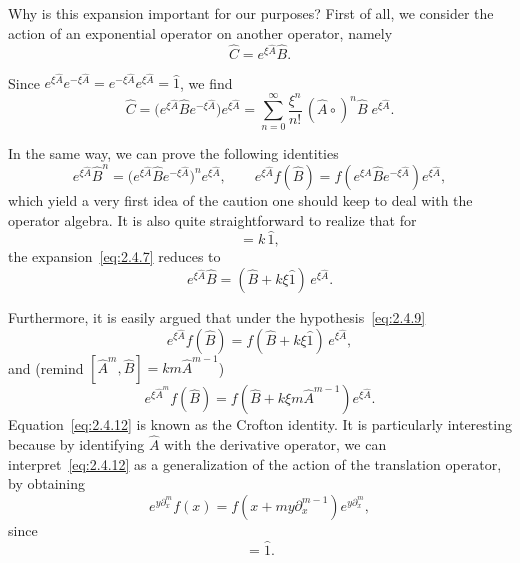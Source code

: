 Why is this expansion important for our purposes? First of all, we consider the action of an exponential operator on another operator, namely
\begin{equation}
\hat{C}=e^{\xi\hat{A}}\hat{B}.
\label{eq:2.4.6}
\end{equation}

Since $e^{\xi\hat{A}}e^{-\xi\hat{A}}=e^{-\xi\hat{A}}e^{\xi\hat{A}}=\hat{1}$, we find
\begin{equation}
\hat{C}=\bigl(e^{\xi\hat{A}}\hat{B}e^{-\xi\hat{A}}\bigr)e^{\xi\hat{A}}
=\sum_{n=0}^{\infty}\frac{\xi^{n}}{n!}\,(\hat{A}\circ)^{n}\hat{B}\;e^{\xi\hat{A}}.
\label{eq:2.4.7}
\end{equation}

In the same way, we can prove the following identities
\begin{equation}
e^{\xi\hat{A}}\hat{B}^{n}
=\bigl(e^{\xi\hat{A}}\hat{B}e^{-\xi\hat{A}}\bigr)^{n}e^{\xi\hat{A}},\qquad
e^{\xi\hat{A}}f(\hat{B})
=f\!\left(e^{\xi\hat{A}}\hat{B}e^{-\xi\hat{A}}\right)e^{\xi\hat{A}},
\label{eq:2.4.8}
\end{equation}
which yield a very first idea of the caution one should keep to deal with the operator algebra. It is also quite straightforward to realize that for
\begin{equation}
[\hat{A},\hat{B}]=k\,\hat{1},
\label{eq:2.4.9}
\end{equation}
the expansion~\eqref{eq:2.4.7} reduces to
\begin{equation}
e^{\xi\hat{A}}\hat{B}=(\hat{B}+k\xi\hat{1})\,e^{\xi\hat{A}}.
\label{eq:2.4.10}
\end{equation}

Furthermore, it is easily argued that under the hypothesis~\eqref{eq:2.4.9}
\begin{equation}
e^{\xi\hat{A}}f(\hat{B})
=f(\hat{B}+k\xi\hat{1})\,e^{\xi\hat{A}},
\label{eq:2.4.11}
\end{equation}
and (remind $[\hat{A}^{m},\hat{B}]=km\hat{A}^{m-1}$)
\begin{equation}
e^{\xi\hat{A}^{m}}f(\hat{B})
=f\!\left(\hat{B}+k\xi m\hat{A}^{m-1}\right)e^{\xi\hat{A}}.
\label{eq:2.4.12}
\end{equation}
Equation~\eqref{eq:2.4.12} is known as the Crofton identity. It is particularly interesting because by identifying $\hat{A}$ with the derivative operator, we can interpret~\eqref{eq:2.4.12} as a generalization of the action of the translation operator, by obtaining
\begin{equation}
e^{y\partial_{x}^{m}}f(x)
=f\!\left(x+my\partial_{x}^{m-1}\right)e^{y\partial_{x}^{m}},
\label{eq:2.4.13}
\end{equation}
since
\begin{equation}
[\partial_{x},x]=\hat{1}.
\label{eq:2.4.14}
\end{equation}

